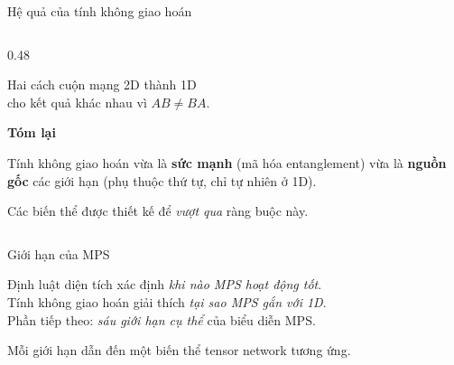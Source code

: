 \documentclass[aspectratio=169, 11pt]{beamer}
\begin{document}
\begin{frame}[shrink=3]{Hệ quả của tính không giao hoán}
\begin{columns}[T]
\begin{column}{0.48\textwidth}
\begin{center}
\end{center}

{\small\centering Hai cách cuộn mạng 2D thành 1D\\cho kết quả khác nhau vì $AB\neq BA$.\par}

\vspace{8pt}
\textcolor{qamber}{\textbf{Tóm lại}}\\[3pt]
{\small Tính không giao hoán vừa là \textbf{sức mạnh} (mã hóa entanglement) vừa là \textbf{nguồn gốc} các giới hạn (phụ thuộc thứ tự, chỉ tự nhiên ở 1D).

\vspace{2pt}
Các biến thể được thiết kế để \textit{vượt qua} ràng buộc này.}

\end{column}
\end{columns}

\end{frame}

\begin{frame}{Giới hạn của MPS}

\vspace{16pt}
\begin{center}
{\large Định luật diện tích xác định \textit{khi nào MPS hoạt động tốt}.\\[8pt]
Tính không giao hoán giải thích \textit{tại sao MPS gắn với 1D}.\\[8pt]
Phần tiếp theo: \textit{sáu giới hạn cụ thể} của biểu diễn MPS.}
\end{center}

\vspace{20pt}
{\small\textcolor{dimtext}{Mỗi giới hạn dẫn đến một biến thể tensor network tương ứng.}}

\end{frame}
\end{document}
